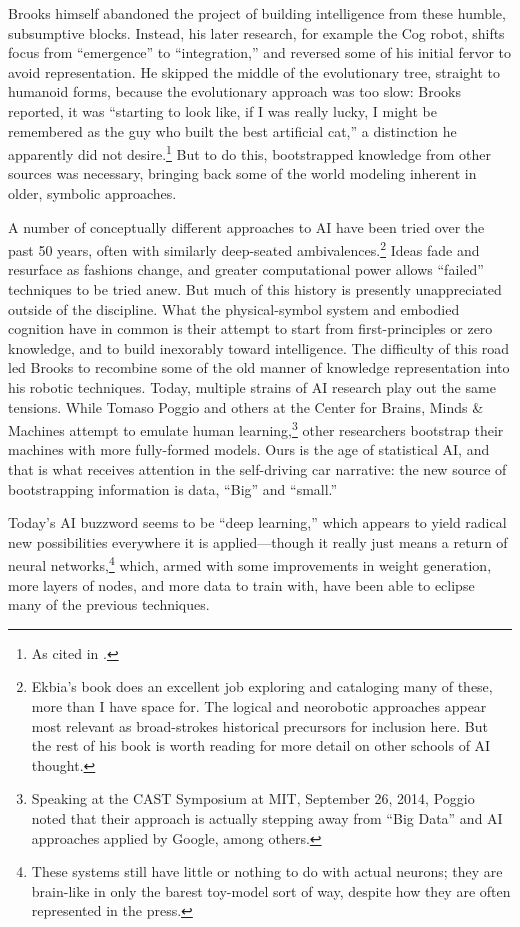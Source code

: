 Brooks himself abandoned the project of building intelligence from
these humble, subsumptive blocks. Instead, his later research, for example
the Cog robot, shifts focus from ``emergence'' to ``integration,'' and
reversed some of his initial fervor to avoid representation.\cite[p.
  258]{ekbia} He skipped the middle of the evolutionary tree, straight
to humanoid forms, because the evolutionary approach was too slow: 
Brooks reported, it was ``starting to look like, if I was really
lucky, I might be remembered as the guy who built the best artificial
cat,'' a distinction he apparently did not desire.\cite[p.
  65]{brooksflesh}\footnote{As cited in \cite[p. 258]{ekbia}.}
But to do this, bootstrapped knowledge from other sources was
necessary, bringing back some of the world modeling inherent in older,
symbolic approaches. 

A number of conceptually different approaches to AI have been tried
over the past 50 years, often with similarly deep-seated
ambivalences.\footnote{Ekbia's book does an excellent job
  exploring and cataloging many of these, more than I have space for.
  The logical and neorobotic approaches appear most relevant as
  broad-strokes historical precursors for inclusion here. But the rest
of his book is worth reading for more detail on other schools of AI thought.} Ideas fade
and resurface as fashions change, and greater computational power
allows ``failed'' techniques to be tried anew. But much of this
history is presently unappreciated outside of the discipline. What the
physical-symbol system and embodied cognition 
have in common is their attempt to start from first-principles or zero
knowledge, and to build inexorably toward intelligence. The difficulty
of this road led Brooks to recombine some of the old manner of
knowledge representation into his robotic techniques. Today, multiple
strains of AI research play out the same tensions. While Tomaso Poggio
and others at the Center for Brains, Minds \& Machines attempt to
emulate human learning,\footnote{Speaking at the CAST Symposium at
  MIT, September 26, 2014, Poggio noted that their approach is
  actually stepping away from ``Big Data'' and AI approaches applied
  by Google, among others.} other researchers bootstrap their machines
with more fully-formed models. Ours is the age of
statistical AI, and that is what receives attention in the
self-driving car narrative: the new source
of bootstrapping information is data, ``Big'' and ``small.''

Today's AI buzzword seems to be ``deep
learning,'' which appears to yield radical new possibilities everywhere it is
applied---though it really just means a return of neural
networks,\footnote{These systems still have little or nothing to do
  with actual neurons; they are brain-like in only the barest
  toy-model sort of way, despite how they are often represented in the
  press.} which, armed with some improvements in weight generation,
more layers of
nodes, and more data to train with, have been able to eclipse many of
the previous techniques.

